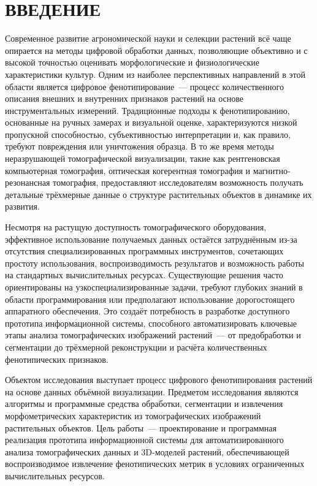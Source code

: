 \documentclass[14pt,a4paper]{extreport}
\begin{document}
\renewcommand{\contentsname}{СОДЕРЖАНИЕ}
\tableofcontents
\newpage

\chapter*{ВВЕДЕНИЕ}

Современное развитие агрономической науки и селекции растений всё чаще опирается на методы цифровой обработки данных, позволяющие объективно и с высокой точностью оценивать морфологические и физиологические характеристики культур. Одним из наиболее перспективных направлений в этой области является цифровое фенотипирование~--- процесс количественного описания внешних и внутренних признаков растений на основе инструментальных измерений. Традиционные подходы к фенотипированию, основанные на ручных замерах и визуальной оценке, характеризуются низкой пропускной способностью, субъективностью интерпретации и, как правило, требуют повреждения или уничтожения образца. В то же время методы неразрушающей томографической визуализации, такие как рентгеновская компьютерная томография, оптическая когерентная томография и магнитно-резонансная томография, предоставляют исследователям возможность получать детальные трёхмерные данные о структуре растительных объектов в динамике их развития.

Несмотря на растущую доступность томографического оборудования, эффективное использование получаемых данных остаётся затруднённым из-за отсутствия специализированных программных инструментов, сочетающих простоту использования, воспроизводимость результатов и возможность работы на стандартных вычислительных ресурсах. Существующие решения часто ориентированы на узкоспециализированные задачи, требуют глубоких знаний в области программирования или предполагают использование дорогостоящего аппаратного обеспечения. Это создаёт потребность в разработке доступного прототипа информационной системы, способного автоматизировать ключевые этапы анализа томографических изображений растений~--- от предобработки и сегментации до трёхмерной реконструкции и расчёта количественных фенотипических признаков.

Объектом исследования выступает процесс цифрового фенотипирования растений на основе данных объёмной визуализации. Предметом исследования являются алгоритмы и программные средства обработки, сегментации и извлечения морфометрических характеристик из томографических изображений растительных объектов. Цель работы~--- проектирование и программная реализация прототипа информационной системы для автоматизированного анализа томографических данных и 3D-моделей растений, обеспечивающей воспроизводимое извлечение фенотипических метрик в условиях ограниченных вычислительных ресурсов.
\end{document}
